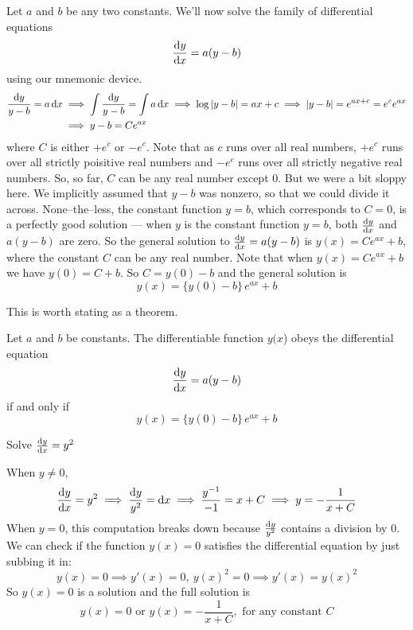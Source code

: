 \begin{eg}\label{eg:SDEsdeFrist}
Let $a$ and $b$ be any two constants. We'll now solve the family of differential
equations
\begin{equation*}
\diff{y}{x} =a(y-b)
\end{equation*}
using our mnemonic device.
\begin{align*}
\frac{\mathrm{d}y}{y-b} =a\,\mathrm{d}x
&\implies
\int \frac{\mathrm{d}y}{y-b}= \int a\,\mathrm{d}x
\implies
\log|y-b|= ax+c
\implies
|y-b|= e^{ax+c} =e^c e^{ax} \\
&\implies y-b = C e^{ax}
\end{align*}
where $C$ is either $+e^c$ or $-e^c$. Note that as $c$ runs over
all real numbers, $+e^c$ runs over all strictly poisitive real
numbers and $-e^c$ runs over all strictly negative real numbers.
So, so far, $C$ can be any real number except $0$.
But we were a bit sloppy here. We implicitly
assumed that $y-b$ was nonzero, so that we could divide it across.
None--the--less, the constant function $y=b$, which corresponds
to $C=0$, is a perfectly good solution --- when $y$
is the constant function $y=b$, both $\diff{y}{x}$ and $a(y-b)$ are zero.
So the general solution to $\diff{y}{x} =a(y-b)$ is $y(x)=C e^{ax}+b$, where
the constant $C$ can be any real number. Note that when $y(x)=C e^{ax}+b$
we have $y(0)=C+b$. So $C=y(0)-b$ and the general solution is
\begin{equation*}
y(x) = \{y(0)-b\}\,e^{ax} + b
\end{equation*}

\end{eg}

This is worth stating as a theorem.
\begin{theorem}\label{thm:linearODE}
Let $a$ and $b$ be constants.
The differentiable function $y(x$) obeys the differential equation
\begin{equation*}
\diff{y}{x} =a(y-b)
\end{equation*}
if and only if
\begin{equation*}
y(x) = \{y(0)-b\}\,e^{ax} + b
\end{equation*}
\end{theorem}

\begin{eg}\label{eg:SDEsdeA}
 Solve $\diff{y}{x}=y^2$

\soln When $y\ne 0$,
\begin{equation*}
\diff{y}{x}=y^2
\implies \frac{\dee{y}}{y^2}=\dee{x}
\implies \frac{y^{-1}}{-1}=x+C
\implies y=-\frac{1}{x+C}
\end{equation*}
When $y=0$, this computation breaks down because  $ \frac{\mathrm{d}y}{y^2}$
contains a division by 0. We can check if the function $y(x)=0$
satisfies the differential equation by just subbing it in:
\begin{equation*}
y(x)=0\implies y'(x)=0,\ y(x)^2=0\implies y'(x)=y(x)^2
\end{equation*}
So $y(x)=0$ is a solution and the full solution is
\begin{equation*}
y(x)=0 \text{ or } y(x)=-\frac{1}{x+C}, \text{ for any constant $C$}
\end{equation*}
\end{eg}

